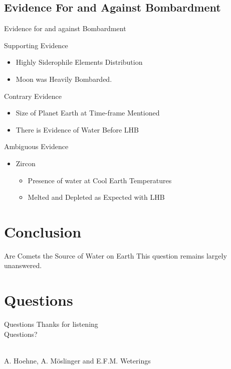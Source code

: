 \documentclass[11pt, aspectratio=169]{beamer}
\begin{document}
\subsection{Evidence For and Against Bombardment}
\begin{frame}[t]{Evidence for and against Bombardment}

Supporting Evidence
\begin{itemize}
    \item Highly Siderophile Elements Distribution
    \item Moon was Heavily Bombarded.
\end{itemize}
\medskip
Contrary Evidence
\begin{itemize}
    \item Size of Planet Earth at Time-frame Mentioned
    \item There is Evidence of Water Before LHB
\end{itemize}
\medskip
Ambiguous Evidence
\begin{itemize}
    \item Zircon
        \begin{itemize}
            \item Presence of water at Cool Earth Temperatures
            \item Melted and Depleted as Expected with LHB
        \end{itemize}
\end{itemize}
\end{frame}


\section{Conclusion}
\begin{frame}[t]{Are Comets the Source of Water on Earth}
\centering
\huge This question remains largely unanswered.
\end{frame}

\section{Questions}
\begin{frame}{Questions}
\centering
\Huge Thanks for listening\\

\huge Questions?\\\

\large A. Hoehne, A. M\"{o}slinger and E.F.M. Weterings\\

\end{frame}
\end{document}
